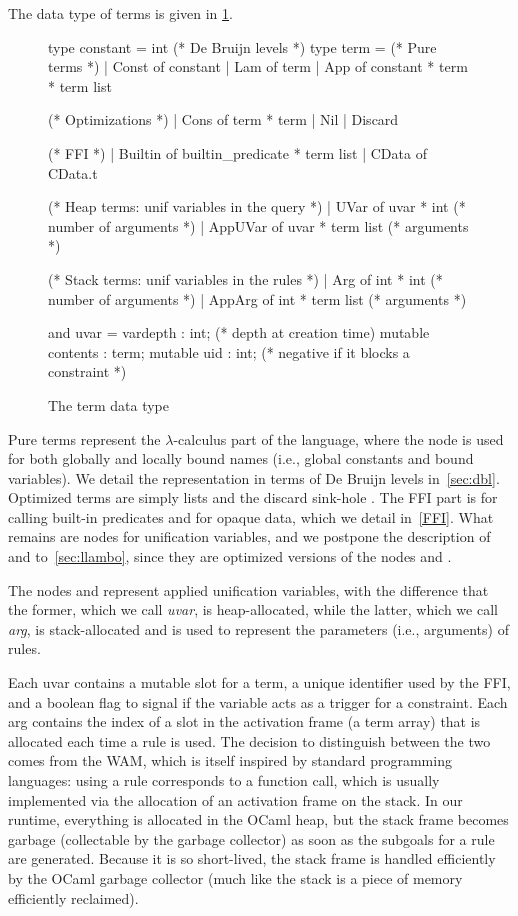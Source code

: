 \documentclass[a4paper, 11pt]{book}
\begin{document}
The data type of terms is given in \cref{fig:term}.
\begin{figure}
\begin{ocamlcode}
type constant = int (* De Bruijn levels *)
type term =
  (* Pure terms *)
  | Const of constant
  | Lam of term
  | App of constant * term * term list

  (* Optimizations *)
  | Cons of term * term
  | Nil
  | Discard

  (* FFI *)
  | Builtin of builtin_predicate * term list
  | CData of CData.t

  (* Heap terms: unif variables in the query *)
  | UVar    of uvar * int (* number of arguments *)
  | AppUVar of uvar * term list (* arguments *)

  (* Stack terms: unif variables in the rules *)
  | Arg    of int * int (* number of arguments *)
  | AppArg of int * term list (* arguments *)

and uvar = {
  vardepth : int; (* depth at creation time)
  mutable contents : term;
  mutable uid : int; (* negative if it blocks a constraint *)
}
\end{ocamlcode}
\caption{The term data type\label{fig:term}}
\end{figure}
Pure terms represent the $\lambda$-calculus part of the language, where the
 node is used for both globally and locally bound names (i.e.,
global constants and bound variables). We detail the representation in terms
of De Bruijn levels in~\cref{sec:dbl}. Optimized terms are simply lists and
the discard sink-hole \elpi{_}. The FFI part is for calling built-in
predicates and for opaque data, which we detail in~\cref{FFI}. What remains
are nodes for unification variables, and we postpone the description of
 and  to~\cref{sec:llambo}, since they are optimized
versions of the nodes  and .


The nodes  and  represent applied unification
variables, with the difference that the former, which we call \emph{uvar}, is
heap-allocated, while the latter, which we call \emph{arg}, is stack-allocated
and is used to represent the parameters (i.e., arguments) of rules.


Each uvar contains a mutable slot for a term, a unique identifier used by the
FFI, and a boolean flag to signal if the variable acts as a trigger for a
constraint. Each arg contains the index of a slot in the activation frame (a
term array) that is allocated each time a rule is used. The decision to
distinguish between the two comes from the WAM, which is itself inspired by
standard programming languages: using a rule corresponds to a function call,
which is usually implemented via the allocation of an activation frame on the
stack. In our runtime, everything is allocated in the OCaml heap, but the
stack frame becomes garbage (collectable by the garbage collector) as soon as
the subgoals for a rule are generated. Because it is so short-lived, the stack
frame is handled efficiently by the OCaml garbage collector (much like the
stack is a piece of memory efficiently reclaimed).
\end{document}
